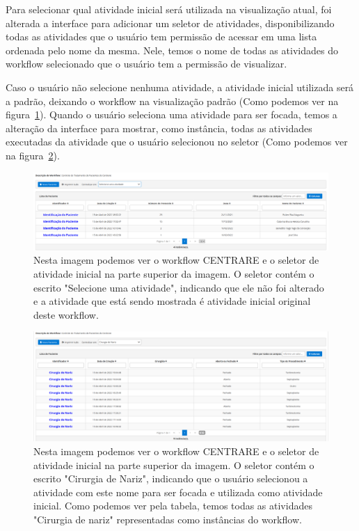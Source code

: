 Para selecionar qual atividade inicial será utilizada na visualização atual, foi alterada a interface para adicionar um seletor de atividades, disponibilizando todas as atividades que o usuário tem permissão de acessar em uma lista ordenada pelo nome da mesma. Nele, temos o nome de todas as atividades do workflow selecionado que o usuário tem a permissão de visualizar.

Caso o usuário não selecione nenhuma atividade, a atividade inicial utilizada será a padrão, deixando o workflow na visualização padrão (Como podemos ver na figura~\ref{fig:centrare_seletor_normal}). Quando o usuário seleciona uma atividade para ser focada, temos a alteração da interface para mostrar, como instância, todas as atividades executadas da atividade que o usuário selecionou no seletor (Como podemos ver na figura~\ref{fig:centrare_seletor_alterado}).

\begin{figure}
    \centering
    \includegraphics[width=1\textwidth]{imgs/CENTRARE/instanciaNormal.png}
    \caption{Nesta imagem podemos ver o workflow CENTRARE e o seletor de atividade inicial na parte superior da imagem. O seletor contém o escrito "Selecione uma atividade", indicando que ele não foi alterado e a atividade que está sendo mostrada é atividade inicial original deste workflow.}
    \label{fig:centrare_seletor_normal}
\end{figure}

\begin{figure}
    \centering
    \includegraphics[width=1\textwidth]{imgs/CENTRARE/instanciaAlterada.png}
    \caption{Nesta imagem podemos ver o workflow CENTRARE e o seletor de atividade inicial na parte superior da imagem. O seletor contém o escrito "Cirurgia de Nariz", indicando que o usuário selecionou a atividade com este nome para ser focada e utilizada como atividade inicial. Como podemos ver pela tabela, temos todas as atividades "Cirurgia de nariz" representadas como instâncias do workflow.}
    \label{fig:centrare_seletor_alterado}
\end{figure}

